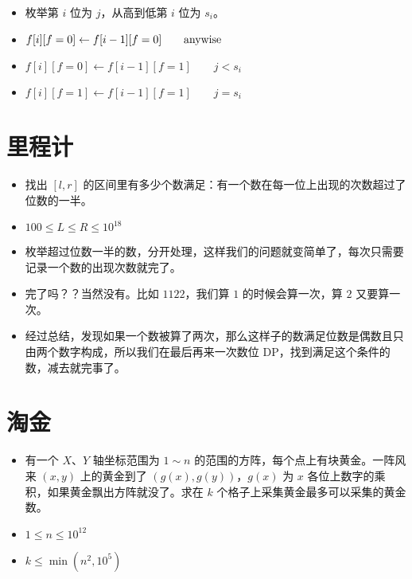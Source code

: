 \documentclass[serif]{beamer}
\begin{document}
\begin{frame}
  \begin{itemize}[<+-| alert@+>]
    \item 枚举第 $i$ 位为 $j$，从高到低第 $i$ 位为 $s_i$。
    \item $f[i][f=0]\gets f[i-1][f=0] \qquad {\rm anywise}$
    \item $f[i][f=0]\gets f[i-1][f=1] \qquad {j<s_i}$
    \item $f[i][f=1]\gets f[i-1][f=1] \qquad {j=s_i}$
  \end{itemize}
\end{frame}

\section{里程计}
\begin{frame}
  \begin{itemize}
    \item 找出 $[l,r]$ 的区间里有多少个数满足：有一个数在每一位上出现的次数超过了位数的一半。
    \item $100\le L\le R\le 10^{18}$
  \end{itemize}
\end{frame}

\begin{frame}
  \begin{itemize}[<+-| alert@+>]
    \item 枚举超过位数一半的数，分开处理，这样我们的问题就变简单了，每次只需要记录一个数的出现次数就完了。
    \item 完了吗？？当然没有。比如 $1122$，我们算 $1$ 的时候会算一次，算 $2$ 又要算一次。
    \item 经过总结，发现如果一个数被算了两次，那么这样子的数满足位数是偶数且只由两个数字构成，所以我们在最后再来一次数位 DP，找到满足这个条件的数，减去就完事了。
  \end{itemize}
\end{frame}

\section{淘金}
\begin{frame}
  \begin{itemize}
    \item 有一个 $X$、$Y$ 轴坐标范围为 $1\sim n$ 的范围的方阵，每个点上有块黄金。一阵风来 $(x,y)$ 上的黄金到了 $(g(x),g(y))$，$g(x)$ 为 $x$ 各位上数字的乘积，如果黄金飘出方阵就没了。求在 $k$ 个格子上采集黄金最多可以采集的黄金数。
    \item $1\le n\le 10^{12}$
    \item $k\le \min(n^2,10^5)$
  \end{itemize}
\end{frame}
\end{document}
